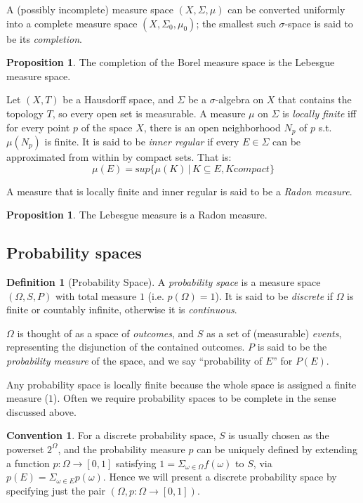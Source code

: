 \documentclass{article}
\newcommand{\alt}{\,|\,}
\theoremstyle{definition}
\newtheorem{definition}{Definition}[section]
\newtheorem{convention}{Convention}[section]
\newtheorem{proposition}[theorem]{Proposition}
\begin{document}
A (possibly incomplete) measure space \((X,\Sigma,\mu)\) can be converted uniformly into a complete measure space \((X,\Sigma_0,\mu_0)\); the smallest such \(\sigma\)-space is said to be its {\em completion}.

\begin{proposition}
  The completion of the Borel measure space is the Lebesgue measure space.  
\end{proposition}


Let \((X,T)\) be a Hausdorff space, and \(\Sigma\) be a \(\sigma\)-algebra on \(X\) that contains the topology \(T\), so every open set is measurable. A measure \(\mu\) on \(\Sigma\) is {\em locally finite} iff for every point \(p\) of the space \(X\), there is an open neighborhood \(N_p\) of \(p\) s.t. \(\mu(N_p)\) is finite. It is said to be {\em inner regular} if every \(E\in \Sigma\) can be approximated from within by compact sets. That is:
\[ \mu(E) = {\mathrm sup}\{\mu(K)\alt K \subseteq E, K {\mathrm compact}\}\]

A measure that is locally finite and inner regular is said to be a {\em Radon measure}.

\begin{proposition}
  The Lebesgue measure is a Radon measure.
\end{proposition}


\subsection{Probability spaces}

\begin{definition}[Probability Space] 
  A {\em probability space} is a measure space \((\Omega, S, P)\) with total measure \(1\) (i.e.{} \(p(\Omega)=1\)). It is said to be {\em discrete} if \(\Omega\) is finite or countably infinite, otherwise it is {\em continuous}.
\end{definition}
\(\Omega\) is thought of as a space of {\em outcomes}, and \(S\) as a set of (measurable) {\em events}, representing the disjunction of the contained outcomes. \(P\) is said to be the {\em probability measure} of the space, and we say ``probability of \(E\)'' for \(P(E)\).

Any probability space is locally finite because the whole space is assigned a finite measure (\(1\)). Often we require probability spaces to be complete in the sense discussed above.

\begin{convention}\label{convention:discrete-ps}
For a discrete probability space, \(S\) is usually chosen as the powerset \(2^{\Omega}\), and the probability measure \(p\) can be uniquely defined by extending a function \(p:\Omega\rightarrow [0,1]\) satisfying \(1=\Sigma_{\omega \in \Omega} f(\omega)\) to \(S\), via \(p(E)=\Sigma_{\omega \in E} p(\omega)\).  Hence we will present a discrete probability space by specifying just the pair \((\Omega, p:\Omega \rightarrow [0,1])\).
\end{convention}
\end{document}
